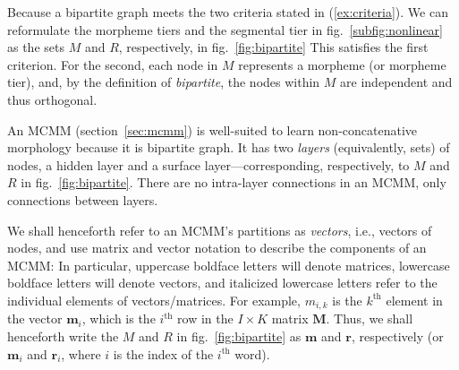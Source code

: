 Because a bipartite graph meets the two criteria stated in
(\ref{ex:criteria}).  We can reformulate the morpheme tiers and the
segmental tier in fig.~\ref{subfig:nonlinear} as the sets $M$ and
$R$, respectively, in fig.~\ref{fig:bipartite} This satisfies the first
criterion. For the second, each node in $M$ represents a morpheme (or
morpheme tier), and, by the definition of \emph{bipartite}, the nodes
within $M$ are independent and thus orthogonal.

An MCMM (section~\ref{sec:mcmm}) is well-suited to learn 
non-concatenative morphology because it is bipartite graph. It has two
\emph{layers} (equivalently, sets) of nodes, a hidden layer and a
surface layer---corresponding, respectively, to $M$ and $R$ in
fig.~\ref{fig:bipartite}. There are no intra-layer connections in an
MCMM, only connections between layers.

We shall henceforth refer to an MCMM's partitions as
\emph{vectors}, i.e., vectors of nodes, and use matrix and vector notation to
describe the components of an MCMM:
In particular, 
uppercase boldface letters will denote matrices, %
lowercase boldface letters will denote vectors,
and italicized lowercase letters refer to the individual elements
of vectors/matrices. %
For example, $m_{i,k}$ is the $k^{\text{th}}$ element in the vector
$\mathbf{m}_i$, which is the $i^{\text{th}}$ row in the $I \times K$ matrix
$\mathbf{M}$. Thus, we shall henceforth write the $M$ and $R$ in
fig.~\ref{fig:bipartite} as $\mathbf{m}$ and $\mathbf{r}$,
respectively (or $\mathbf{m}_i$ and $\mathbf{r}_i$, where $i$ is the
index of the $i^{\text{th}}$ word).